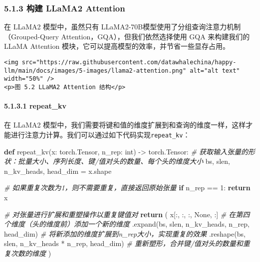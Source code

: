 \documentclass[
]{article}
\newenvironment{Shaded}{}{}
\newcommand{\BuiltInTok}[1]{\textcolor[rgb]{0.00,0.50,0.00}{#1}}
\newcommand{\CommentTok}[1]{\textcolor[rgb]{0.38,0.63,0.69}{\textit{#1}}}
\newcommand{\ControlFlowTok}[1]{\textcolor[rgb]{0.00,0.44,0.13}{\textbf{#1}}}
\newcommand{\DecValTok}[1]{\textcolor[rgb]{0.25,0.63,0.44}{#1}}
\newcommand{\KeywordTok}[1]{\textcolor[rgb]{0.00,0.44,0.13}{\textbf{#1}}}
\newcommand{\NormalTok}[1]{#1}
\newcommand{\OperatorTok}[1]{\textcolor[rgb]{0.40,0.40,0.40}{#1}}
\newcommand{\VariableTok}[1]{\textcolor[rgb]{0.10,0.09,0.49}{#1}}
\begin{document}
\subsubsection{5.1.3 构建 LLaMA2
Attention}\label{ux6784ux5efa-llama2-attention}

在 LLaMA2 模型中，虽然只有
LLaMA2-70B模型使用了分组查询注意力机制（Grouped-Query
Attention，GQA），但我们依然选择使用 GQA 来构建我们的 LLaMA Attention
模块，它可以提高模型的效率，并节省一些显存占用。

\begin{verbatim}
<img src="https://raw.githubusercontent.com/datawhalechina/happy-llm/main/docs/images/5-images/llama2-attention.png" alt="alt text" width="50%" />
<p>图 5.2 LLaMA2 Attention 结构</p>
\end{verbatim}

\paragraph{5.1.3.1 repeat\_kv}\label{repeat_kv}

在 LLaMA2
模型中，我们需要将键和值的维度扩展到和查询的维度一样，这样才能进行注意力计算。我们可以通过如下代码实现\texttt{repeat\_kv}：

\begin{Shaded}
\begin{Highlighting}[]
\KeywordTok{def}\NormalTok{ repeat\_kv(x: torch.Tensor, n\_rep: }\BuiltInTok{int}\NormalTok{) }\OperatorTok{{-}\textgreater{}}\NormalTok{ torch.Tensor:}
    \CommentTok{\# 获取输入张量的形状：批量大小、序列长度、键/值对头的数量、每个头的维度大小}
\NormalTok{    bs, slen, n\_kv\_heads, head\_dim }\OperatorTok{=}\NormalTok{ x.shape}
    
    \CommentTok{\# 如果重复次数为1，则不需要重复，直接返回原始张量}
    \ControlFlowTok{if}\NormalTok{ n\_rep }\OperatorTok{==} \DecValTok{1}\NormalTok{:}
        \ControlFlowTok{return}\NormalTok{ x}
    
    \CommentTok{\# 对张量进行扩展和重塑操作以重复键值对}
    \ControlFlowTok{return}\NormalTok{ (}
\NormalTok{        x[:, :, :, }\VariableTok{None}\NormalTok{, :]  }\CommentTok{\# 在第四个维度（头的维度前）添加一个新的维度}
\NormalTok{        .expand(bs, slen, n\_kv\_heads, n\_rep, head\_dim)  }\CommentTok{\# 将新添加的维度扩展到n\_rep大小，实现重复的效果}
\NormalTok{        .reshape(bs, slen, n\_kv\_heads }\OperatorTok{*}\NormalTok{ n\_rep, head\_dim)  }\CommentTok{\# 重新塑形，合并键/值对头的数量和重复次数的维度}
\NormalTok{    )}
\end{Highlighting}
\end{Shaded}
\end{document}
